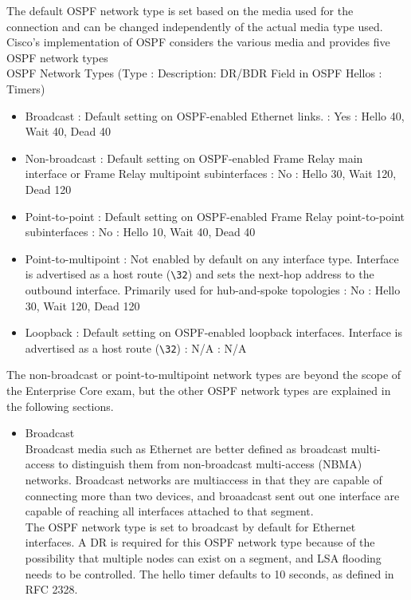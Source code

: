 \documentclass{article}
\begin{document}
\begin{itemize}
\begin{itemize}
				The default OSPF network type is set based on the media used for the connection and can be changed independently of the actual media type used. Cisco's implementation of OSPF considers the various media and provides five OSPF network types\\

				OSPF Network Types (Type : Description: DR/BDR Field in OSPF Hellos : Timers)
				\begin{itemize}
					\item Broadcast : Default setting on OSPF-enabled Ethernet links. : Yes : Hello 40, Wait 40, Dead 40
					\item Non-broadcast : Default setting on OSPF-enabled Frame Relay main interface or Frame Relay multipoint subinterfaces : No : Hello 30, Wait 120, Dead 120
					\item Point-to-point : Default setting on OSPF-enabled Frame Relay point-to-point subinterfaces : No : Hello 10, Wait 40, Dead 40
					\item Point-to-multipoint : Not enabled by default on any interface type. Interface is advertised as a host route (\verb|\32|) and sets the next-hop address to the outbound interface. Primarily used for hub-and-spoke topologies : No : Hello 30, Wait 120, Dead 120
					\item Loopback : Default setting on OSPF-enabled loopback interfaces. Interface is advertised as a host route (\verb|\32|) : N/A : N/A
				\end{itemize}

				The non-broadcast or point-to-multipoint network types are beyond the scope of the Enterprise Core exam, but the other OSPF network types are explained in the following sections.	
				\begin{itemize}
					\item Broadcast\\
						Broadcast media such as Ethernet are better defined as broadcast multi-access to distinguish them from non-broadcast multi-access (NBMA) networks. Broadcast networks are multiaccess in that they are capable of connecting more than two devices, and broaadcast sent out one interface are capable of reaching all interfaces attached to that segment.\\

						The OSPF network type is set to broadcast by default for Ethernet interfaces. A DR is required for this OSPF network type because of the possibility that multiple nodes can exist on a segment, and LSA flooding needs to be controlled. The hello timer defaults to 10 seconds, as defined in RFC 2328.\\


\end{itemize}
\end{itemize}
\end{itemize}
\end{document}
